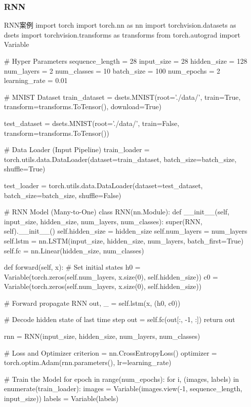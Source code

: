 \documentclass[openbib]{article}
\begin{document}
\subsubsection{RNN}
\begin{Python}{RNN案例}
	import torch
	import torch.nn as nn
	import torchvision.datasets as dsets
	import torchvision.transforms as transforms
	from torch.autograd import Variable
	
	# Hyper Parameters
	sequence_length = 28
	input_size = 28
	hidden_size = 128
	num_layers = 2
	num_classes = 10
	batch_size = 100
	num_epochs = 2
	learning_rate = 0.01
	
	# MNIST Dataset
	train_dataset = dsets.MNIST(root='./data/',
	train=True,
	transform=transforms.ToTensor(),
	download=True)
	
	test_dataset = dsets.MNIST(root='./data/',
	train=False,
	transform=transforms.ToTensor())
	
	# Data Loader (Input Pipeline)
	train_loader = torch.utils.data.DataLoader(dataset=train_dataset,
	batch_size=batch_size,
	shuffle=True)
	
	test_loader = torch.utils.data.DataLoader(dataset=test_dataset,
	batch_size=batch_size,
	shuffle=False)
	
	
	# RNN Model (Many-to-One)
	class RNN(nn.Module):
	def __init__(self, input_size, hidden_size, num_layers, num_classes):
	super(RNN, self).__init__()
	self.hidden_size = hidden_size
	self.num_layers = num_layers
	self.lstm = nn.LSTM(input_size, hidden_size, num_layers, batch_first=True)
	self.fc = nn.Linear(hidden_size, num_classes)
	
	def forward(self, x):
	# Set initial states
	h0 = Variable(torch.zeros(self.num_layers, x.size(0), self.hidden_size))
	c0 = Variable(torch.zeros(self.num_layers, x.size(0), self.hidden_size))
	
	# Forward propagate RNN
	out, _ = self.lstm(x, (h0, c0))
	
	# Decode hidden state of last time step
	out = self.fc(out[:, -1, :])
	return out
	
	
	rnn = RNN(input_size, hidden_size, num_layers, num_classes)
	
	# Loss and Optimizer
	criterion = nn.CrossEntropyLoss()
	optimizer = torch.optim.Adam(rnn.parameters(), lr=learning_rate)
	
	# Train the Model
	for epoch in range(num_epochs):
	for i, (images, labels) in enumerate(train_loader):
	images = Variable(images.view(-1, sequence_length, input_size))
	labels = Variable(labels)
	

\end{Python}
\end{document}
